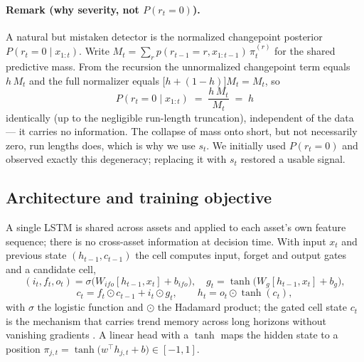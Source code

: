 \documentclass[11pt,a4paper]{article}
\theoremstyle{definition}
\begin{document}
\paragraph{Remark (why severity, not $P(r_t{=}0)$).} A natural but mistaken detector is the
normalized changepoint posterior $P(r_t{=}0\mid x_{1:t})$. Write
$M_t=\sum_r p(r_{t-1}{=}r,x_{1:t-1})\,\pi^{(r)}_t$ for the shared predictive mass. From the recursion
the unnormalized changepoint term equals $h\,M_t$ and the full normalizer equals
$\big[h+(1-h)\big]M_t=M_t$, so
\begin{equation}
P(r_t{=}0\mid x_{1:t}) \;=\; \frac{h\,M_t}{M_t} \;=\; h
\end{equation}
identically (up to the negligible run-length truncation), independent of the data --- it carries no
information. The collapse of mass onto short, but not necessarily zero, run lengths does, which is why
we use $s_t$. We initially used $P(r_t{=}0)$ and observed exactly this degeneracy; replacing it with
$s_t$ restored a usable signal.

\subsection{Architecture and training objective}
A single LSTM \cite{hochreiter1997} is shared across assets and applied to each asset's own feature
sequence; there is no cross-asset information at decision time. With input $x_t$ and previous state
$(h_{t-1},c_{t-1})$ the cell computes input, forget and output gates and a candidate cell,
\begin{equation}
(i_t,f_t,o_t)=\sigma\!\big(W_{ifo}[h_{t-1},x_t]+b_{ifo}\big),\quad
g_t=\tanh\!\big(W_g[h_{t-1},x_t]+b_g\big),
\end{equation}
\begin{equation}
c_t=f_t\odot c_{t-1}+i_t\odot g_t,\qquad h_t=o_t\odot\tanh(c_t),
\end{equation}
with $\sigma$ the logistic function and $\odot$ the Hadamard product; the gated cell state $c_t$ is
the mechanism that carries trend memory across long horizons without vanishing gradients
\cite{hochreiter1997}. A linear head with a $\tanh$ maps the hidden state to a position
$\pi_{j,t}=\tanh\!\big(w^\top h_{j,t}+b\big)\in[-1,1]$.
\end{document}
